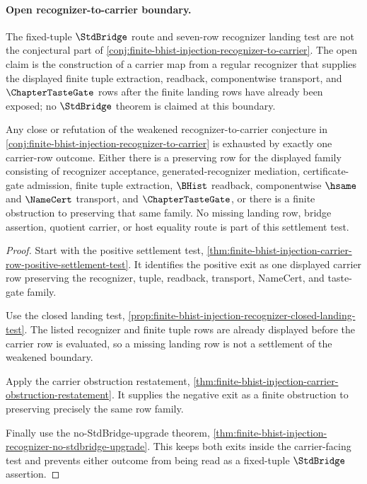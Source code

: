 \paragraph{Open recognizer-to-carrier boundary.}
The fixed-tuple $\StdBridge$ route and seven-row recognizer landing test are not the conjectural part of \autoref{conj:finite-bhist-injection-recognizer-to-carrier}. The open claim is the construction of a carrier map from a regular recognizer that supplies the displayed finite tuple extraction, readback, componentwise transport, and $\ChapterTasteGate$ rows after the finite landing rows have already been exposed; no $\StdBridge$ theorem is claimed at this boundary.

\begin{theorem}
\label{thm:finite-bhist-injection-carrier-row-settlement-restatement}
Any close or refutation of the weakened recognizer-to-carrier conjecture in \autoref{conj:finite-bhist-injection-recognizer-to-carrier} is exhausted by exactly one carrier-row outcome. Either there is a preserving row for the displayed family consisting of recognizer acceptance, generated-recognizer mediation, certificate-gate admission, finite tuple extraction, $\BHist$ readback, componentwise $\hsame$ and $\NameCert$ transport, and $\ChapterTasteGate$, or there is a finite obstruction to preserving that same family. No missing landing row, bridge assertion, quotient carrier, or host equality route is part of this settlement test.
\end{theorem}
\begin{proof}
Start with the positive settlement test, \autoref{thm:finite-bhist-injection-carrier-row-positive-settlement-test}. It identifies the positive exit as one displayed carrier row preserving the recognizer, tuple, readback, transport, NameCert, and taste-gate family.

Use the closed landing test, \autoref{prop:finite-bhist-injection-recognizer-closed-landing-test}. The listed recognizer and finite tuple rows are already displayed before the carrier row is evaluated, so a missing landing row is not a settlement of the weakened boundary.

Apply the carrier obstruction restatement, \autoref{thm:finite-bhist-injection-carrier-obstruction-restatement}. It supplies the negative exit as a finite obstruction to preserving precisely the same row family.

Finally use the no-StdBridge-upgrade theorem, \autoref{thm:finite-bhist-injection-recognizer-no-stdbridge-upgrade}. This keeps both exits inside the carrier-facing test and prevents either outcome from being read as a fixed-tuple $\StdBridge$ assertion.
\end{proof}

